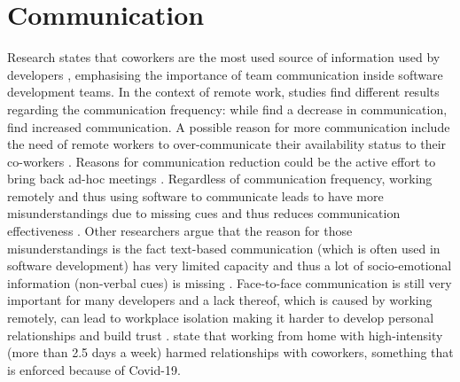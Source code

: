 \section{Communication}
Research states that coworkers are the most used source of information used by developers \autocite{ko2007information}, emphasising the importance of team communication inside software development teams. In the context of remote work, studies find different results regarding the communication frequency: while \textcite{kraut1988patterns, allen1984managing} find a decrease in communication, \textcite{mulki2009set} find increased communication. A possible reason for more communication include the need of remote workers to over-communicate their availability status to their co-workers \autocite{koehne2012remote}. Reasons for communication reduction could be the active effort to bring back ad-hoc meetings \autocite{miller2021your}. Regardless of communication frequency, working remotely and thus using software to communicate leads to have more misunderstandings due to missing cues and thus reduces communication effectiveness \autocite{mulki2009set}. Other researchers argue that the reason for those misunderstandings is the fact text-based communication (which is often used in software development) has very limited capacity and thus a lot of socio-emotional information (non-verbal cues) is missing \autocite{hassib2017heartchat}. Face-to-face communication is still very important for many developers \autocite{storey2016social} and a lack thereof, which is caused by working remotely, can lead to workplace isolation making it harder to develop personal relationships and build trust \autocite{mulki2009set}. \textcite{gajendran2007good} state that working from home with high-intensity (more than 2.5 days a week) harmed relationships with coworkers, something that is enforced because of Covid-19.




